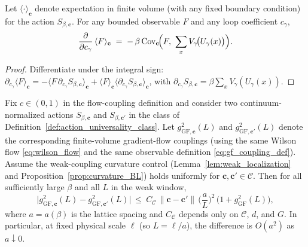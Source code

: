 \begin{lemma}\label{lem:duhamel_covariance}
Let $\langle\cdot\rangle_{\mathbf c}$ denote expectation in finite volume (with any fixed boundary condition) for the action
$S_{\beta,\mathbf c}$.
For any bounded observable $F$ and any loop coefficient $c_\gamma$,
\begin{equation}\label{eq:duhamel_formula}
 \frac{\partial}{\partial c_\gamma}\,\langle F\rangle_{\mathbf c}
 \;=\; -\,\beta\,\mathrm{Cov}_{\mathbf c}\!\Bigl(F,\ \sum_{x} V_\gamma\!\bigl(U_\gamma(x)\bigr)\Bigr).
\end{equation}
\end{lemma}

\begin{proof}
Differentiate under the integral sign:
$\partial_{c_\gamma}\langle F\rangle_{\mathbf c}
= -\langle F\,\partial_{c_\gamma}S_{\beta,\mathbf c}\rangle_{\mathbf c}
+\langle F\rangle_{\mathbf c}\langle \partial_{c_\gamma}S_{\beta,\mathbf c}\rangle_{\mathbf c}$,
with $\partial_{c_\gamma}S_{\beta,\mathbf c}=\beta\sum_x V_\gamma(U_\gamma(x))$.
\end{proof}

\begin{proposition}\label{prop:gf_stability_discretization}
Fix $c\in(0,1)$ in the flow-coupling definition and consider two continuum-normalized actions $S_{\beta,\mathbf c}$ and $S_{\beta,\mathbf c'}$
in the class of Definition~\ref{def:action_universality_class}.
Let $g^2_{\mathrm{GF},\mathbf c}(L)$ and $g^2_{\mathrm{GF},\mathbf c'}(L)$ denote the corresponding finite-volume gradient-flow couplings
(using the same Wilson flow \eqref{eq:wilson_flow} and the same observable definition \eqref{eq:gf_coupling_def}).
Assume the weak-coupling curvature control (Lemma~\ref{lem:weak_localization} and Proposition~\ref{prop:curvature_BL}) holds uniformly for
$\mathbf c,\mathbf c'\in\mathcal C$.
Then for all sufficiently large $\beta$ and all $L$ in the weak window,
\begin{equation}\label{eq:gf_stability_bound}
 \big|g^2_{\mathrm{GF},\mathbf c}(L)-g^2_{\mathrm{GF},\mathbf c'}(L)\big|
 \ \le\ C_{\mathcal C}\,\|\mathbf c-\mathbf c'\|\,\Big(\frac{a}{L}\Big)^{2}\,\big(1+g^2_{\mathrm{GF}}(L)\big),
\end{equation}
where $a=a(\beta)$ is the lattice spacing and $C_{\mathcal C}$ depends only on $\mathcal C$, $d$, and $G$.
In particular, at fixed physical scale $\ell$ (so $L=\ell/a$), the difference is $O(a^2)$ as $a\downarrow 0$.
\end{proposition}

